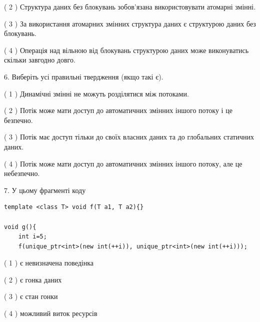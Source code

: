 \documentclass[12pt, ukrainian]{article}
\begin{document}
\begin {large}
{( 2 ) Структура даних без блокувань зобов’язана використовувати атомарні змінні.%

( 3 ) За використання атомарних змінних структура даних є структурою даних без блокувань.%

( 4 ) Операція над вільною від блокувань структурою даних може виконуватись скільки завгодно довго.%
\newpage



\vspace{5mm}
6. Виберіть усі правильні твердження (якщо такі є).\par
\vspace{2mm}

( 1 ) Динамічні змінні не можуть розділятися між потоками.%

( 2 ) Потік може мати доступ до автоматичних змінних іншого потоку і це безпечно.%

( 3 ) Потік має доступ тільки до своїх власних даних та до глобальних статичних даних.%

( 4 ) Потік може мати доступ до автоматичних змінних іншого потоку, але це небезпечно.%


\vspace{5mm}
7. У цьому фрагменті коду
\begin{verbatim}
template <class T> void f(T a1, T a2){}

void g(){
    int i=5;
    f(unique_ptr<int>(new int(++i)), unique_ptr<int>(new int(++i)));
\end{verbatim}

( 1 ) є невизначена поведінка%

( 2 ) є гонка даних%

( 3 ) є стан гонки%

( 4 ) можливий виток ресурсів%
}
\end {large}
\end{document}
